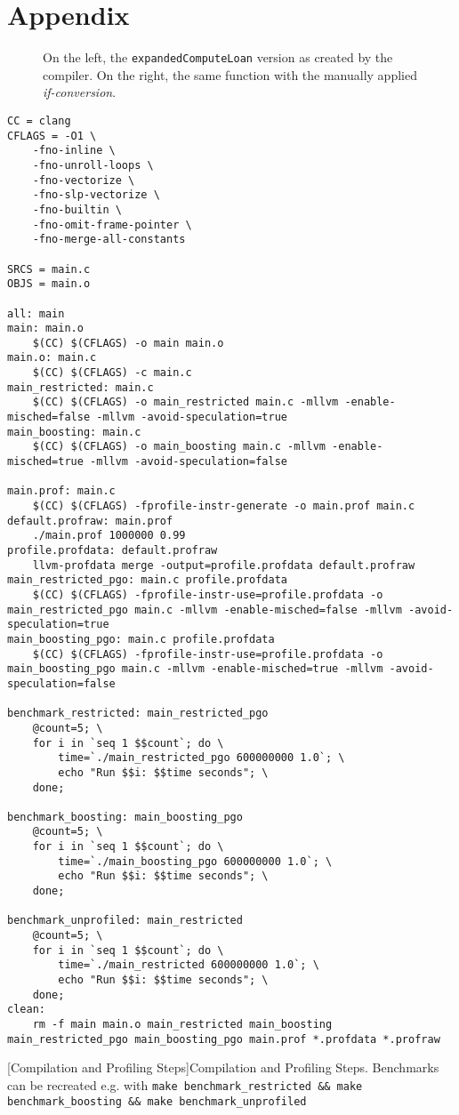 \section{Appendix}
\label{app:first}

\begin{figure}[H]
    
    \caption[\texttt{expandedComputeLoan} Code]{On the left, the \texttt{expandedComputeLoan} version as created by the compiler. On the right, the same function with the manually applied \textit{if-conversion}.}
\end{figure}
\newpage

\begin{center}
    \begin{lstlisting}[style=AsmStyle]
CC = clang
CFLAGS = -O1 \
    -fno-inline \
    -fno-unroll-loops \
    -fno-vectorize \
    -fno-slp-vectorize \
    -fno-builtin \
    -fno-omit-frame-pointer \
    -fno-merge-all-constants

SRCS = main.c
OBJS = main.o

all: main
main: main.o
	$(CC) $(CFLAGS) -o main main.o
main.o: main.c
	$(CC) $(CFLAGS) -c main.c
main_restricted: main.c
	$(CC) $(CFLAGS) -o main_restricted main.c -mllvm -enable-misched=false -mllvm -avoid-speculation=true
main_boosting: main.c
	$(CC) $(CFLAGS) -o main_boosting main.c -mllvm -enable-misched=true -mllvm -avoid-speculation=false

main.prof: main.c
	$(CC) $(CFLAGS) -fprofile-instr-generate -o main.prof main.c
default.profraw: main.prof
	./main.prof 1000000 0.99
profile.profdata: default.profraw
	llvm-profdata merge -output=profile.profdata default.profraw
main_restricted_pgo: main.c profile.profdata
	$(CC) $(CFLAGS) -fprofile-instr-use=profile.profdata -o main_restricted_pgo main.c -mllvm -enable-misched=false -mllvm -avoid-speculation=true
main_boosting_pgo: main.c profile.profdata
	$(CC) $(CFLAGS) -fprofile-instr-use=profile.profdata -o main_boosting_pgo main.c -mllvm -enable-misched=true -mllvm -avoid-speculation=false

benchmark_restricted: main_restricted_pgo
	@count=5; \
	for i in `seq 1 $$count`; do \
		time=`./main_restricted_pgo 600000000 1.0`; \
		echo "Run $$i: $$time seconds"; \
	done; 

benchmark_boosting: main_boosting_pgo
	@count=5; \
	for i in `seq 1 $$count`; do \
		time=`./main_boosting_pgo 600000000 1.0`; \
		echo "Run $$i: $$time seconds"; \
	done; 

benchmark_unprofiled: main_restricted
	@count=5; \
	for i in `seq 1 $$count`; do \
		time=`./main_restricted 600000000 1.0`; \
		echo "Run $$i: $$time seconds"; \
	done; 
clean:
	rm -f main main.o main_restricted main_boosting main_restricted_pgo main_boosting_pgo main.prof *.profdata *.profraw
    \end{lstlisting}
    \captionsetup{type=listing}
    [Compilation and Profiling Steps]{Compilation and Profiling Steps. Benchmarks can be recreated e.g. with \texttt{make benchmark\_restricted \&\& make benchmark\_boosting \&\& make benchmark\_unprofiled}}
    \label{ls:makefile_specprof}
\end{center}
